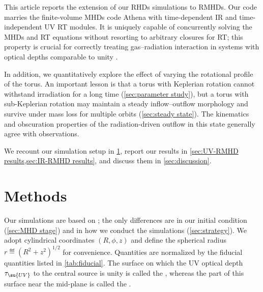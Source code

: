 \documentclass[twocolumn]{article}
\begin{document}
This article reports the extension of our \acp{RHD} simulations
 to \acp{RMHD}. Our code marries the
finite-volume \acp{MHD} code Athena \citep{2008ApJS..178..137S} with
time-dependent \ac{IR} \citep{2014ApJS..213....7J} and time-independent \ac{UV}
 \ac{RT} modules. It is uniquely capable of
concurrently solving the \acp{MHD} and \ac{RT} equations without resorting to
arbitrary closures for \ac{RT}; this property is crucial for correctly treating
gas--radiation interaction in systems with optical depths comparable to unity
\citep{2012ApJS..199....9D}.

In addition, we quantitatively explore the effect of varying the rotational
profile of the torus. An important lesson is that a torus with Keplerian
rotation cannot withstand irradiation for a long time (\cref{sec:parameter
study}), but a torus with sub-Keplerian rotation may maintain a steady
inflow--outflow morphology and survive under mass loss for multiple orbits
(\cref{sec:steady state}). The kinematics and obscuration properties of the
radiation-driven outflow in this  state generally agree with
observations.

We recount our simulation setup in \cref{sec:methods}, report our results in
\cref{sec:UV-RMHD results,sec:IR-RMHD results}, and discuss them in
\cref{sec:discussion}.

\section{Methods}
\label{sec:methods}

Our simulations are based on ; the only
differences are in our initial condition (\cref{sec:MHD stage}) and in how we
conduct the simulations (\cref{sec:strategy}). We adopt cylindrical coordinates
$(R,\phi,z)$ and define the spherical radius $r\eqdef(R^2+z^2)^{1/2}$ for
convenience. Quantities are normalized by the fiducial quantities listed in
\cref{tab:fiducial}. The surface on which the \ac{UV} optical depth
$\tau_\su{UV}$ to the central source is unity is called the , whereas the part of this surface near the mid-plane is called the
.
\end{document}

